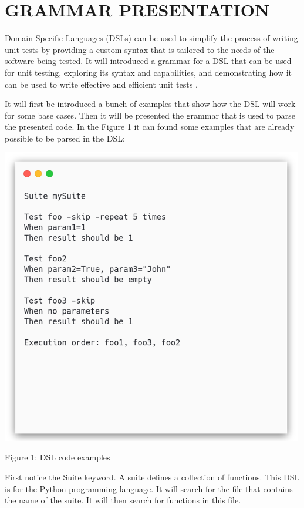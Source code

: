 \chapter{GRAMMAR PRESENTATION}
Domain-Specific Languages (DSLs) can be used to simplify the process of writing unit tests by providing a custom syntax that is tailored to the needs of the software being tested. It will introduced a grammar for a DSL that can be used for unit testing, exploring its syntax and capabilities, and demonstrating how it can be used to write effective and efficient unit tests \cite{dadario}.

It will first be introduced a bunch of examples that show how the DSL will work for some base cases. Then it will be presented the grammar that is used to parse the presented code.
In the Figure 1 it can found some examples that are already possible to be parsed in the DSL:

{ \centering \includegraphics[width=\textwidth , height=13cm]{images/code_ex.png} }
\begin{center} Figure 1: DSL code examples \end{center}


First notice the Suite keyword. A suite defines a collection of functions. This DSL is for the Python programming language. It will search for the file that contains the name of the suite. It will then search for functions in this file.

